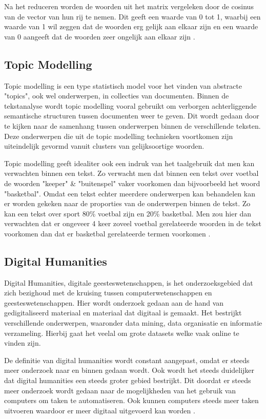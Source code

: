 Na het reduceren worden de woorden uit het matrix vergeleken door de cosinus van de vector van hun rij te nemen. Dit geeft een waarde van 0 tot 1, waarbij een waarde van 1 wil zeggen dat de woorden erg gelijk aan elkaar zijn en een waarde van 0 aangeeft dat de woorden zeer ongelijk aan elkaar zijn \citep{dumais2004latent}.

\subsection{Topic Modelling}
Topic modelling is een type statistisch model voor het vinden van abstracte "topics", ook wel onderwerpen, in collecties van documenten. Binnen de tekstanalyse wordt topic modelling vooral gebruikt om verborgen achterliggende semantische structuren tussen documenten weer te geven. Dit wordt gedaan door te kijken naar de samenhang tussen onderwerpen binnen de verschillende teksten. Deze onderwerpen die uit de topic modelling technieken voortkomen zijn uiteindelijk gevormd vanuit clusters van gelijksoortige woorden.

Topic modelling geeft idealiter ook een indruk van het taalgebruik dat men kan verwachten binnen een tekst. Zo verwacht men dat binnen een tekst over voetbal de woorden "keeper" \& "buitenspel" vaker voorkomen dan bijvoorbeeld het woord "basketbal". Omdat een tekst echter meerdere onderwerpen kan behandelen kan er worden gekeken naar de proporties van de onderwerpen binnen de tekst. Zo kan een tekst over sport 80\% voetbal zijn en 20\% basketbal. Men zou hier dan verwachten dat er ongeveer 4 keer zoveel voetbal gerelateerde woorden in de tekst voorkomen dan dat er basketbal gerelateerde termen voorkomen \citep{sojka2010software}.

\subsection{Digital Humanities}
Digital Humanities, digitale geesteswetenschappen, is het onderzoeksgebied dat zich bezighoud met de kruising tussen computerwetenschappen en geesteswetenschappen. Hier wordt onderzoek gedaan aan de hand van gedigitaliseerd materiaal en materiaal dat digitaal is gemaakt. Het bestrijkt verschillende onderwerpen, waaronder data mining, data organisatie en informatie verzameling. Hierbij gaat het veelal om grote datasets welke vaak online te vinden zijn. 

De definitie van digital humanities wordt constant aangepast, omdat er steeds meer onderzoek naar en binnen gedaan wordt. Ook wordt het steeds duidelijker dat digital humanities een steeds groter gebied bestrijkt. Dit doordat er steeds meer onderzoek wordt gedaan naar de mogelijkheden van het gebruik van computers om taken te automatiseren. Ook kunnen computers steeds meer taken uitvoeren waardoor er meer digitaal uitgevoerd kan worden \citep{berry2012understanding}.

